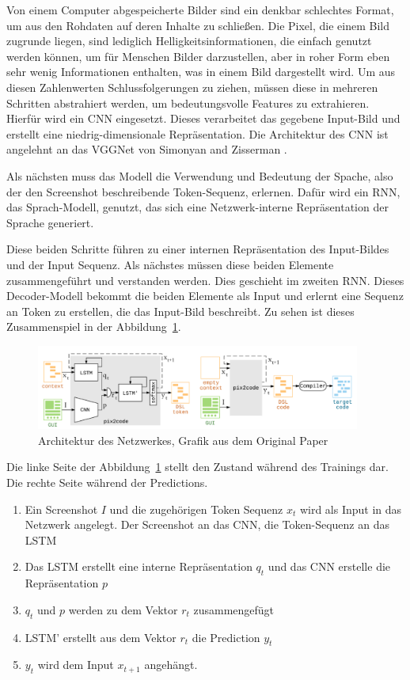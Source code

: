 \documentclass[pdftex,a4paper,halfparskip, article]{scrartcl}
\begin{document}
Von einem Computer abgespeicherte Bilder sind ein denkbar schlechtes Format, um aus den Rohdaten auf deren Inhalte zu schließen. Die Pixel, die einem Bild zugrunde liegen, sind lediglich Helligkeitsinformationen, die einfach genutzt werden können, um für Menschen Bilder darzustellen, aber in roher Form eben sehr wenig Informationen enthalten, was in einem Bild dargestellt wird. Um aus diesen Zahlenwerten Schlussfolgerungen zu ziehen, müssen diese in mehreren Schritten abstrahiert werden, um bedeutungsvolle Features zu extrahieren. Hierfür wird ein CNN eingesetzt. Dieses verarbeitet das gegebene Input-Bild und erstellt eine niedrig-dimensionale Repräsentation. Die Architektur des CNN ist angelehnt an das VGGNet von Simonyan and Zisserman \cite{DBLP:journals/corr/SimonyanZ14a}.

Als nächsten muss das Modell die Verwendung und Bedeutung der Spache, also der den Screenshot beschreibende Token-Sequenz, erlernen. Dafür wird ein RNN, das Sprach-Modell, genutzt, das sich eine Netzwerk-interne Repräsentation der Sprache generiert. 

Diese beiden Schritte führen zu einer internen Repräsentation des Input-Bildes und der Input Sequenz. Als nächstes müssen diese beiden Elemente zusammengeführt und verstanden werden. Dies geschieht im zweiten RNN. Dieses Decoder-Modell bekommt die beiden Elemente als Input und erlernt eine Sequenz an Token zu erstellen, die das Input-Bild beschreibt. Zu sehen ist dieses Zusammenspiel in der Abbildung~\ref{fig:pix2code_paper_architecture}.

\begin{figure}[h]
\centering
\includegraphics[width=0.95\textwidth]{pix2code_paper_architecture}
\caption{Architektur des Netzwerkes, Grafik aus dem Original Paper \cite{Beltramelli17}}
\label{fig:pix2code_paper_architecture}
\end{figure}

Die linke Seite der Abbildung~\ref{fig:pix2code_paper_architecture} stellt den Zustand während des Trainings dar. Die rechte Seite während der Predictions.

\begin{enumerate} 
\item Ein Screenshot $I$ und die zugehörigen Token Sequenz $x_t$ wird als Input in das Netzwerk angelegt. Der Screenshot an das CNN, die Token-Sequenz an das LSTM
\item Das LSTM erstellt eine interne Repräsentation $q_t$ und das CNN erstelle die Repräsentation $p$
\item $q_t$ und $p$ werden zu dem Vektor $r_t$ zusammengefügt
\item LSTM' erstellt aus dem Vektor $r_t$ die Prediction $y_t$
\item $y_t$ wird dem Input $x_{t+1}$ angehängt.
\end{enumerate}
\end{document}
